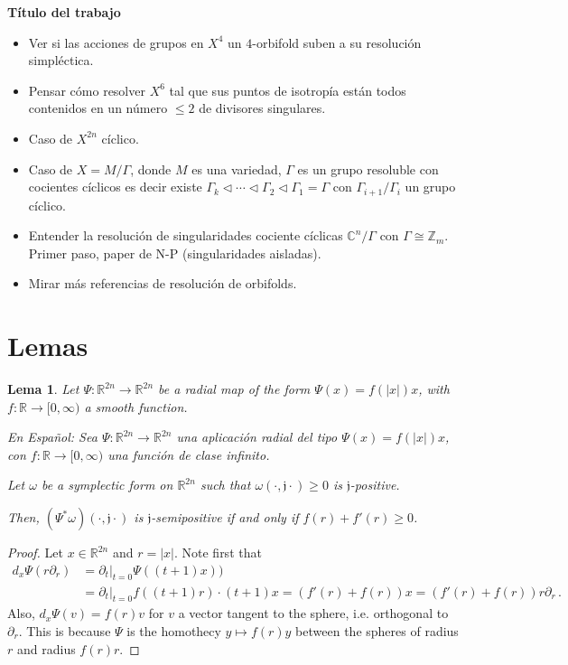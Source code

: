 \documentclass[12pt,reqno]{amsart}
\newcommand{\bd}{\partial}
\newcommand{\ZZ}{\mathbb{Z}}
\newcommand{\CC}{\mathbb{C}}
\newcommand{\RR}{\mathbb{R}}
\renewcommand{\o}{\omega}
\newcommand{\G}{\Gamma}
\newcommand{\frj}{\mathfrak{j}}
\newtheorem{lemma}[theorem]{Lema}
\begin{document}
\begin{center}
\Large{\textbf{T\'itulo del trabajo}}
\end{center}


{\color{blue}

\begin{itemize}
\item Ver si las acciones de grupos en $X^4$ un $4$-orbifold suben a su resoluci\'on simpl\'ectica.

\item Pensar c\'omo resolver $X^6$ tal que sus puntos de isotrop\'ia est\'an todos contenidos
en un n\'umero $\le 2$ de divisores singulares.

\item Caso de $X^{2n}$ c\'iclico.

\item Caso de $X=M/\G$, donde $M$ es una variedad, $\G$ es un grupo resoluble con cocientes c\'iclicos
es decir existe $\G_k \lhd \cdots \lhd \G_2 \lhd \G_1=\G$
con $\G_{i+1}/\G_i$ un grupo c\'iclico.

\item Entender la resoluci\'on de singularidades cociente c\'iclicas $\CC^n/\G$
con $\G \cong \ZZ_m$. Primer paso, paper de N-P (singularidades aisladas).

\item Mirar m\'as referencias de resoluci\'on de orbifolds.
\end{itemize}

\section{Lemas}


\begin{lemma}
Let $\Psi: \RR^{2n} \to \RR^{2n}$ be a radial map of the form
$\Psi(x)=f(|x|) x$, with $f:\RR \to [0,\infty)$ a smooth function.

{\color{blue} En Espa\~nol: Sea $\Psi: \RR^{2n} \to \RR^{2n}$ una aplicaci\'on radial del tipo
$\Psi(x)=f(|x|) x$, con $f:\RR \to [0,\infty)$ una función de clase infinito.}

Let $\o$ be a symplectic form on $\RR^{2n}$ such that
$\o(\cdot, \frj \cdot) \ge 0$ is $\frj$-positive.

Then, $(\Psi^*\o) (\cdot, \frj \cdot)$ is $\frj$-semipositive
if and only if $f(r)+f'(r) \ge 0$.
\end{lemma}
\begin{proof}
Let $x \in \RR^{2n}$ and $r=|x|$.
Note first that 
\begin{align*}
d_x \Psi(r \bd_r) & = \bd_t|_{t=0} \Psi((t+1)x)) \\
& = \bd_t|_{t=0} f((t+1)r) \cdot (t+1)x=(f'(r) + f(r))x= (f'(r) + f(r))r \bd_r \, .
\end{align*}
Also, $d_x \Psi (v)= f(r) v$ for $v$ a vector tangent to the sphere,
i.e. orthogonal to $\bd_r$. This is because $\Psi$ is the homothecy $y \mapsto f(r)y$ between the spheres of radius $r$ and radius $f(r) r$.


\end{proof}}
\end{document}
